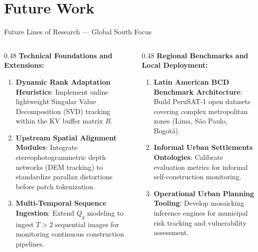 \documentclass[aspectratio=169]{beamer}
\begin{document}
\section{Future Work}

\begin{frame}{Future Lines of Research — Global South Focus}

\begin{columns}[T]
\begin{column}{0.48\textwidth}
\textbf{\color{utecblue}Technical Foundations and Extensions:}
\vskip 0.15cm
\begin{enumerate}
  \item \textbf{Dynamic Rank Adaptation Heuristics}: Implement online lightweight Singular Value Decomposition (SVD) tracking within the KV buffer matrix $B$.
  \item \textbf{Upstream Spatial Alignment Modules}: Integrate stereophotogrammetric depth networks (DEM tracking) to standardize parallax distortions before patch tokenization.
  \item \textbf{Multi-Temporal Sequence Ingestion}: Extend $Q_g$ modeling to ingest $T > 2$ sequential images for monitoring continuous construction pipelines.
\end{enumerate}
\end{column}

\begin{column}{0.48\textwidth}
\textbf{\color{utecblue}Regional Benchmarks and Local Deployment:}
\vskip 0.15cm
\begin{enumerate}
  \item \textbf{Latin American BCD Benchmark Architecture}: Build PeruSAT-1 open datasets covering complex metropolitan zones (Lima, São Paulo, Bogotá).
  \item \textbf{Informal Urban Settlements Ontologies}: Calibrate evaluation metrics for informal self-construction monitoring.
  \item \textbf{Operational Urban Planning Tooling}: Develop mosaicking inference engines for municipal risk tracking and vulnerability assessment.
\end{enumerate}
\end{column}
\end{columns}

\end{frame}
\end{document}
